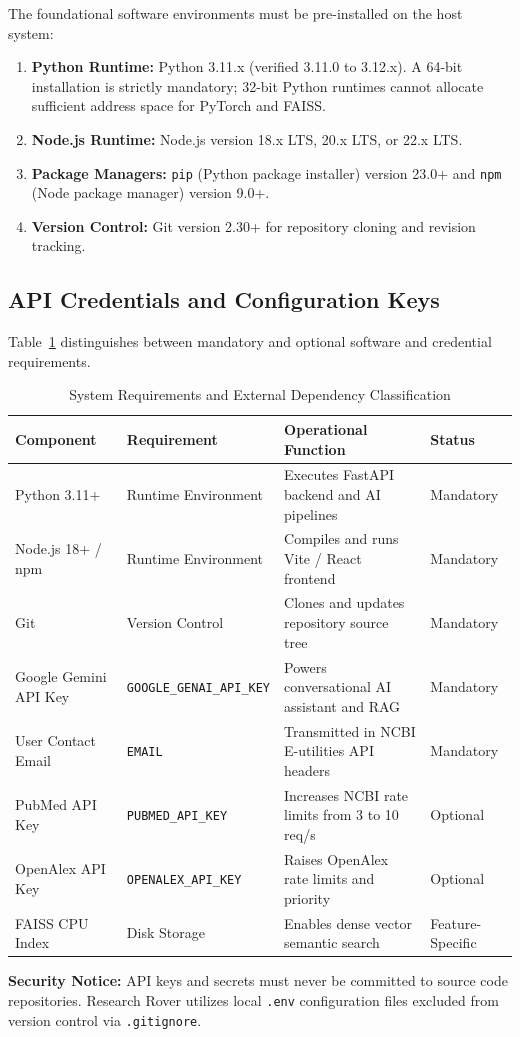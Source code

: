 The foundational software environments must be pre-installed on the host system:
\begin{enumerate}
    \item \textbf{Python Runtime:} Python 3.11.x (verified 3.11.0 to 3.12.x). A 64-bit installation is strictly mandatory; 32-bit Python runtimes cannot allocate sufficient address space for PyTorch and FAISS.
    \item \textbf{Node.js Runtime:} Node.js version 18.x LTS, 20.x LTS, or 22.x LTS.
    \item \textbf{Package Managers:} \texttt{pip} (Python package installer) version 23.0+ and \texttt{npm} (Node package manager) version 9.0+.
    \item \textbf{Version Control:} Git version 2.30+ for repository cloning and revision tracking.
\end{enumerate}

\subsection{API Credentials and Configuration Keys}
Table~\ref{tab:requirements_summary} distinguishes between mandatory and optional software and credential requirements.

\begin{table}[H]
\centering
\caption{System Requirements and External Dependency Classification}
\label{tab:requirements_summary}
\begin{tabularx}{\textwidth}{l p{3.2cm} X l}
\toprule
\textbf{Component} & \textbf{Requirement} & \textbf{Operational Function} & \textbf{Status} \\
\midrule
Python 3.11+ & Runtime Environment & Executes FastAPI backend and AI pipelines & Mandatory \\
Node.js 18+ / npm & Runtime Environment & Compiles and runs Vite / React frontend & Mandatory \\
Git & Version Control & Clones and updates repository source tree & Mandatory \\
Google Gemini API Key & \texttt{GOOGLE\_GENAI\_API\_KEY} & Powers conversational AI assistant and RAG & Mandatory \\
User Contact Email & \texttt{EMAIL} & Transmitted in NCBI E-utilities API headers & Mandatory \\
PubMed API Key & \texttt{PUBMED\_API\_KEY} & Increases NCBI rate limits from 3 to 10 req/s & Optional \\
OpenAlex API Key & \texttt{OPENALEX\_API\_KEY} & Raises OpenAlex rate limits and priority & Optional \\
FAISS CPU Index & Disk Storage & Enables dense vector semantic search & Feature-Specific \\
\bottomrule
\end{tabularx}
\end{table}

\noindent \textbf{Security Notice:} API keys and secrets must never be committed to source code repositories. Research Rover utilizes local \texttt{.env} configuration files excluded from version control via \texttt{.gitignore}.
